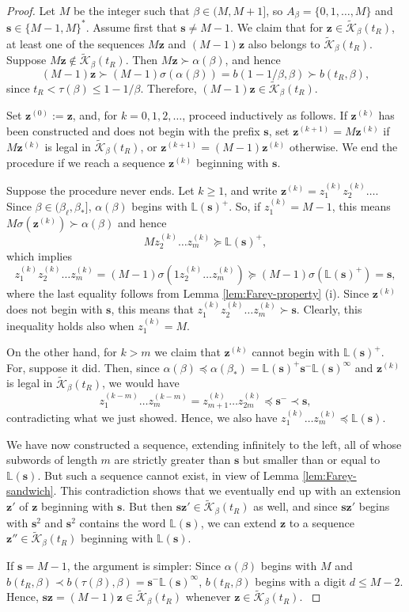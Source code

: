 \documentclass[11pt]{amsart}
\theoremstyle{definition}
\theoremstyle{remark}
\numberwithin{equation}{section}
\renewcommand{\L}{\ensuremath{\mathbb{L}}}
\newcommand{\Kt}{\widetilde{\mathcal{K}}}
\newcommand{\s}{ {\mathbf{s}}}
\newcommand{\z}{\mathbf{z}}
\newcommand{\f}{\infty}
\newcommand{\al}{\alpha}
\newcommand{\lle}{\preccurlyeq}
\newcommand{\lge}{\succcurlyeq}
\newcommand{\si}{\sigma}
\begin{document}
\begin{proof}
{Let $M$ be the integer such that $\beta\in(M,M+1]$, so $A_\beta=\{0,1,\dots,M\}$ and $\s\in\{M-1,M\}^*$. Assume first that $\s\neq M-1$.
We claim that for $\z\in \Kt_\beta(t_R)$, at least one of the sequences $M\z$ and $(M-1)\z$ also belongs to $\Kt_\beta(t_R)$. Suppose $M\z\not\in\Kt_\beta(t_R)$. Then $M\z\succ\al(\beta)$, and hence 
$$(M-1)\z\succ (M-1)\si(\al(\beta))=b(1-1/\beta,\beta)\succ b(t_R,\beta),$$ 
since $t_R<\tau(\beta)\leq 1-1/\beta$. Therefore, $(M-1)\z\in\Kt_\beta(t_R)$.}

Set $\z^{(0)}:=\z$, and, for $k=0,1,2,\dots$, proceed inductively as follows. If $\z^{(k)}$ has been constructed and does not begin with the prefix $\s$, set $\z^{(k+1)}={M}\z^{(k)}$ if ${M}\z^{(k)}$ is legal in $\Kt_\beta(t_R)$, or $\z^{(k+1)}={(M-1)}\z^{(k)}$ otherwise. We end the procedure if we reach a sequence $\z^{(k)}$ beginning with $\s$.

Suppose the procedure never ends. Let $k\geq 1$, and write $\z^{(k)}=z_1^{(k)}z_2^{(k)}\dots$. %
 Since $\beta\in(\beta_\ell,\beta_*]$, $\al(\beta)$ begins with $\L(\s)^+$. So, if $z_1^{(k)}={M-1}$, this means ${M}\si(\z^{(k)})\succ \al(\beta)$ and hence
\[
{M}z_2^{(k)}\dots z_m^{(k)}\lge \L(\s)^+,
\]
which implies
\[
z_1^{(k)}z_2^{(k)}\dots z_m^{(k)}={(M-1)}\si(1z_2^{(k)}\dots z_m^{(k)})\lge {(M-1)}\si(\L(\s)^+)=\s,
\]
where the last equality follows from Lemma \ref{lem:Farey-property} (i). Since $\z^{(k)}$ does not begin with $\s$, this means that $z_1^{(k)}z_2^{(k)}\dots z_m^{(k)}\succ \s$. Clearly, this inequality holds also when $z_1^{(k)}={M}$.

On the other hand, for $k>m$ we claim that $\z^{(k)}$ cannot begin with $\L(\s)^+$. For, suppose it did. Then, since $\al(\beta)\lle \al(\beta_*)=\L(\s)^+\s^-\L(\s)^\f$ and $\z^{(k)}$ is legal in $\Kt_\beta(t_R)$, we would have
\[
z_1^{(k-m)}\dots z_m^{(k-m)}=z_{m+1}^{(k)}\dots z_{2m}^{(k)}\lle \s^-\prec\s,
\]
contradicting what we just showed. Hence, we also have $z_1^{(k)}\dots z_m^{(k)}\lle \L(\s)$.

We have now constructed a sequence, extending infinitely to the left, all of whose subwords of length $m$ are strictly greater than $\s$ but smaller than or equal to $\L(\s)$. But such a sequence cannot exist, in view of Lemma \ref{lem:Farey-sandwich}. This contradiction shows that we eventually end up with an extension $\z'$ of $\z$ beginning with $\s$. But then $\s\z'\in\Kt_\beta(t_R)$ as well, and since $\s\z'$ begins with $\s^2$ and $\s^2$ contains the word $\L(\s)$, we can extend $\z$ to a sequence $\z''\in \Kt_{\beta}(t_R)$ beginning with $\L(\s)$.

{ If $\s=M-1$, the argument is simpler: Since $\al(\beta)$ begins with $M$ and $b(t_R,\beta)\prec b(\tau(\beta),\beta)=\s^-\L(\s)^\f$, $b(t_R,\beta)$ begins with a digit $d\leq M-2$. Hence, $\s\z=(M-1)\z\in\Kt_\beta(t_R)$ whenever $\z\in\Kt_\beta(t_R)$.
}
\end{proof}
\end{document}
